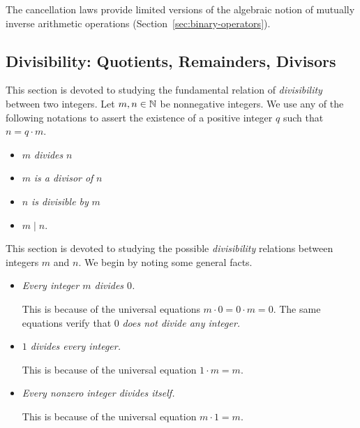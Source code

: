 \noindent
The cancellation laws provide limited versions of the algebraic notion of mutually inverse arithmetic operations (Section~\ref{sec:binary-operators}).


\subsection{Divisibility: Quotients, Remainders, Divisors}
\label{sec:divisibility}
 

This section is devoted to studying the fundamental relation of {\em divisibility} between two integers.  Let $m, n \in \mathbb{N}$ be nonnegative integers.  We use any of the following notations to assert the existence of a positive integer $q$ such that $n = q \cdot m$.
 
\begin{itemize}
\item
$m$ {\it divides} $n$
\item
$m$ {\it is a divisor of} $n$
\item
$n$ {\it is divisible by} $m$
\item
$m \mid n$.
\end{itemize}
This section is devoted to studying the possible {\it divisibility} relations between integers $m$ and $n$.  We begin by noting some general facts.
\begin{itemize}
\item
{\em Every integer $m$ divides $0$.}

\smallskip

This is because of the universal equations $m \cdot 0 = 0 \cdot m = 0$.   The same equations verify that $0$ {\em does not divide any integer.}

\item
{\em $1$ divides every integer.}

\smallskip

This is because of the universal equation $1 \cdot m = m$.
\item
{\em Every nonzero integer divides itself.}

\smallskip

This is because of the universal equation $m \cdot 1 = m$.
\end{itemize}

